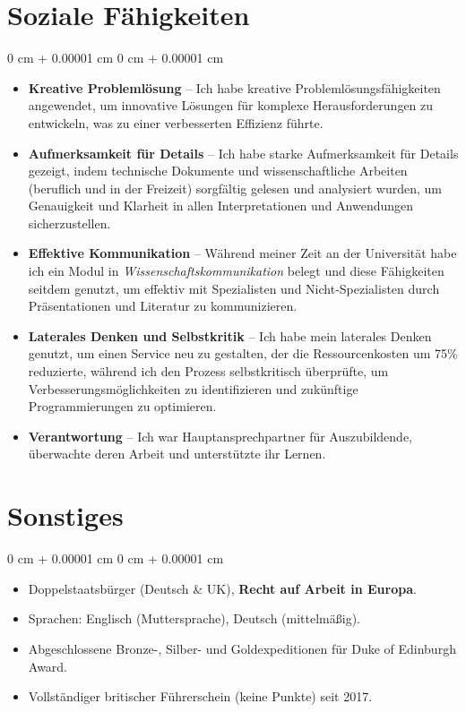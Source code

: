 \documentclass[10pt, letterpaper]{article}
\newenvironment{highlights}{
    \begin{itemize}[
        topsep=0.2 cm,
        parsep=0.2 cm,
        partopsep=0pt,
        itemsep=0.025 cm,
        leftmargin=0 cm + 10pt
    ]
}{
    \end{itemize}
}
\newenvironment{onecolentry}{
    \begin{adjustwidth}{
        0 cm + 0.00001 cm
    }{
        0 cm + 0.00001 cm
    }
}{
    \end{adjustwidth}
}
\begin{document}
        \vspace{0.15 cm}

    \section{Soziale Fähigkeiten}

        \begin{onecolentry}
            \begin{highlights}
                \item \textbf{Kreative Problemlösung} -- Ich habe kreative Problemlösungsfähigkeiten angewendet, um innovative Lösungen für komplexe Herausforderungen zu entwickeln, was zu einer verbesserten Effizienz führte.
                \item \textbf{Aufmerksamkeit für Details} -- Ich habe starke Aufmerksamkeit für Details gezeigt, indem technische Dokumente und wissenschaftliche Arbeiten (beruflich und in der Freizeit) sorgfältig gelesen und analysiert wurden, um Genauigkeit und Klarheit in allen Interpretationen und Anwendungen sicherzustellen.
                \item \textbf{Effektive Kommunikation} -- Während meiner Zeit an der Universität habe ich ein Modul in \textit{Wissenschaftskommunikation} belegt und diese Fähigkeiten seitdem genutzt, um effektiv mit Spezialisten und Nicht-Spezialisten durch Präsentationen und Literatur zu kommunizieren.
                \item \textbf{Laterales Denken und Selbstkritik} -- Ich habe mein laterales Denken genutzt, um einen Service neu zu gestalten, der die Ressourcenkosten um 75\% reduzierte, während ich den Prozess selbstkritisch überprüfte, um Verbesserungsmöglichkeiten zu identifizieren und zukünftige Programmierungen zu optimieren.
                \item \textbf{Verantwortung} -- Ich war Hauptansprechpartner für Auszubildende, überwachte deren Arbeit und unterstützte ihr Lernen.
            \end{highlights}
        \end{onecolentry}

        \vspace{0.15 cm}

    \section{Sonstiges}

        \begin{onecolentry}
            \begin{highlights}
            \item Doppelstaatsbürger (Deutsch \& UK), \textbf{Recht auf Arbeit in Europa}.
                \item Sprachen: Englisch (Muttersprache), Deutsch (mittelmäßig).
                \item Abgeschlossene Bronze-, Silber- und Goldexpeditionen für Duke of Edinburgh Award.
                \item Vollständiger britischer Führerschein (keine Punkte) seit 2017.
            \end{highlights}
        \end{onecolentry}
\end{document}
